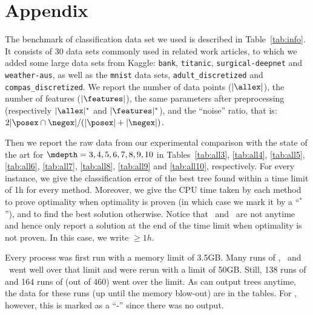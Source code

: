 \documentclass{llncs}
\begin{document}

\clearpage


\section*{Appendix}

The benchmark of classification data set we used is described in Table~\ref{tab:info}. It consists of 30 data sets 
commonly used in related work articles, to which we added some large data sets from Kaggle: \texttt{bank}, \texttt{titanic}, \texttt{surgical-deepnet} and \texttt{weather-aus}, as well as the \texttt{mnist} data sets, \texttt{adult\_discretized} and \texttt{compas\_discretized}. We report the number of data points ($|\allex|$), the number of features ($|\features|$), the same parameters after preprocessing (respectively $|\allex|^*$ and $|\features|^*$), and the ``noise'' ratio, that is: $2|\posex \cap \negex|/(|\posex|+|\negex|)$.

\medskip

Then we report the raw data from our experimental comparison with the state of the art for $\mdepth=3,4,5,6,7,8,9,10$
in Tables~\ref{tab:all3},
\ref{tab:all4},
\ref{tab:all5},
\ref{tab:all6},
\ref{tab:all7},
\ref{tab:all8},
\ref{tab:all9} and \ref{tab:all10}, respectively.
For every instance, we give the classification error of the best tree found within a time limit of 1h for every method. Moreover, we give the CPU time taken by each method to prove optimality when optimality is proven (in which case we mark it by a ``$^*$''), and to find the best solution otherwise. Notice that \cp\ and \dleight\ are not anytime and hence only report a solution at the end of the time limit when optimality is not proven. In this case, we write $\geq1h$. 

\medskip

Every process was first run with a memory limit of 3.5GB. Many runs of \dleight, \cp\ and \binoct\ went well over that limit and were rerun with a limit of 50GB. Still, 138 runs of \binoct and 164 runs of \dleight (out of 460) went over the limit. As \binoct can output trees anytime, the data for these runs (up until the memory blow-out) are in the tables. For \dleight, however, this is marked as a ``-'' since there was no output.


\renewcommand{\arraystretch}{.9}
\end{document}
